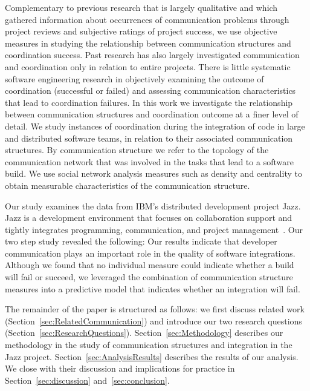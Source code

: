 \documentclass[12pt,oneside]{book}
\begin{document}
Complementary to previous research that is largely qualitative
\cite{herbsleb2003:speed,Holmstrom:2006gd} and which gathered information about
occurrences of communication problems through project reviews and subjective
ratings of project success, we use objective measures in studying the
relationship between communication structures and coordination success. Past
research has also largely investigated communication and coordination only in
relation to entire projects. There is little systematic software engineering
research in objectively examining the outcome of coordination (successful or
failed) and assessing communication characteristics that lead to coordination
failures. In this work we investigate the relationship between communication
structures and coordination outcome at a finer level of detail. We study
instances of coordination during the integration of code in large and distributed
software teams, in relation to their associated communication structures. By
communication structure we refer to the topology of the communication network
that was involved in the tasks that lead to a software build. We use social
network analysis measures such as density and centrality to obtain measurable
characteristics of the communication structure.


Our study examines the data from IBM's distributed development project Jazz. Jazz
is a development environment that focuses on collaboration support and tightly
integrates programming, communication, and project
management~\cite{frost:ieeesoftware:2007}. Our two step study revealed the following: Our
results indicate that developer communication plays an important role in the
quality of software integrations. Although we found that no individual measure
could indicate whether a build will fail or succeed, we leveraged the combination
of communication structure measures into a predictive model that indicates
whether an integration will fail.

The remainder of the paper is structured as follows: we first discuss related
work (Section~\ref{sec:RelatedCommunication}) and introduce our two research
questions (Section~\ref{sec:ResearchQuestions}). Section~\ref{sec:Methodology}
describes our methodology in the study of communication structures and
integration in the Jazz project. Section~\ref{sec:AnalysisResults} describes the
results of our analysis. We close with their discussion and implications for
practice in Section~\ref{sec:discussion} and~\ref{sec:conclusion}.
\end{document}
